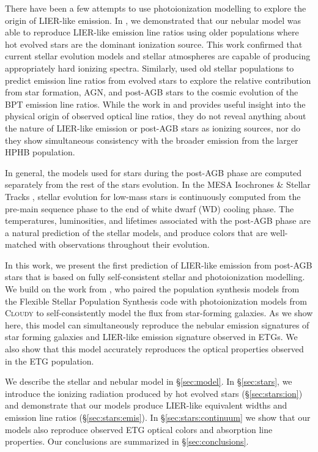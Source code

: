 \documentclass[preprint2]{aastex62}
\newcommand{\FSPS}{{\sc FSPS}\xspace}
\newcommand{\Cloudy}{\textsc{Cloudy}\xspace}
\begin{document}
There have been a few attempts to use photoionization modelling to explore the origin of LIER-like emission. In \citet{Byler+2017}, we demonstrated that our nebular model was able to reproduce LIER-like emission line ratios using older populations where hot evolved stars are the dominant ionization source. This work confirmed that current stellar evolution models and stellar atmospheres are capable of producing appropriately hard ionizing spectra. Similarly, \citet{Hirschmann+2017} used old stellar populations to predict emission line ratios from evolved stars to explore the relative contribution from star formation, AGN, and post-AGB stars to the cosmic evolution of the BPT emission line ratios. While the work in \citet{Byler+2017} and \citet{Hirschmann+2017} provides useful insight into the physical origin of observed optical line ratios, they do not reveal anything about the nature of LIER-like emission or post-AGB stars as ionizing sources, nor do they show simultaneous consistency with the broader emission from the larger HPHB population.

In general, the models used for stars during the post-AGB phase are computed separately from the rest of the stars evolution. In the MESA Isochrones \& Stellar Tracks \citep[MIST; ][]{Dotter+2016, Choi+2016}, stellar evolution for low-mass stars is continuously computed from the pre-main sequence phase to the end of white dwarf (WD) cooling phase. The temperatures, luminosities, and lifetimes associated with the post-AGB phase are a natural prediction of the stellar models, and produce colors that are well-matched with observations throughout their evolution.

In this work, we present the first prediction of LIER-like emission from post-AGB stars that is based on fully self-consistent stellar and photoionization modelling. We build on the work from \citet{Byler+2017}, who paired the population synthesis models from the Flexible Stellar Population Synthesis code \citep[\FSPS; ][]{Conroy+2009} with photoionization models from \Cloudy \citep{Ferland+2013} to self-consistently model the flux from star-forming galaxies. As we show here, this model can simultaneously reproduce the nebular emission signatures of star forming galaxies and LIER-like emission signature observed in ETGs. We also show that this model accurately reproduces the optical properties observed in the ETG population.

We describe the stellar and nebular model in \S\ref{sec:model}. In \S\ref{sec:stars}, we introduce the ionizing radiation produced by hot evolved stars (\S\ref{sec:stars:ion}) and demonstrate that our models produce LIER-like equivalent widths and emission line ratios (\S\ref{sec:stars:emis}). In \S\ref{sec:stars:continuum} we show that our models also reproduce observed ETG optical colors and absorption line properties. Our conclusions are summarized in \S\ref{sec:conclusions}.
\end{document}
